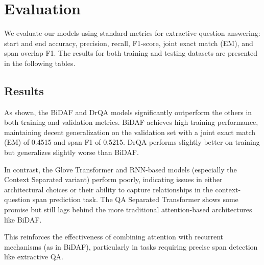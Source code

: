 \documentclass[runningheads]{llncs}
\begin{document}
\section{Evaluation}

We evaluate our models using standard metrics for extractive question answering: start and end accuracy, precision, recall, F1-score, joint exact match (EM), and span overlap F1. The results for both training and testing datasets are presented in the following tables.

\subsection{Results}

As shown, the BiDAF and DrQA models significantly outperform the others in both training and validation metrics. BiDAF achieves high training performance, maintaining decent generalization on the validation set with a joint exact match (EM) of 0.4515 and span F1 of 0.5215. DrQA performs slightly better on training but generalizes slightly worse than BiDAF.
\\
\par
In contrast, the Glove Transformer and RNN-based models (especially the Context Separated variant) perform poorly, indicating issues in either architectural choices or their ability to capture relationships in the context-question span prediction task. The QA Separated Transformer shows some promise but still lags behind the more traditional attention-based architectures like BiDAF.
\\
\par
This reinforces the effectiveness of combining attention with recurrent mechanisms (as in BiDAF), particularly in tasks requiring precise span detection like extractive QA.
\\
\par
\end{document}
